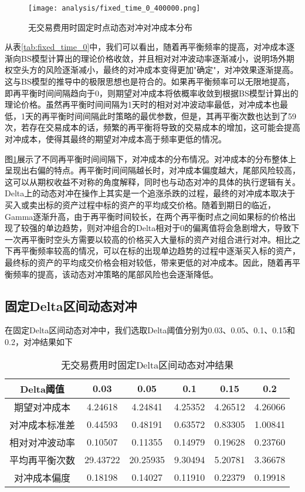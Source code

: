 \begin{figure}[htb]
  \centering
  \texttt{[image: analysis/fixed\_time\_0\_400000.png]}
  \caption[这里将出现在插图索引中]
    {无交易费用时固定时点动态对冲对冲成本分布}
  \label{fig:fixed_time_0}
\end{figure}

从表\ref{tab:fixed_time_0}中，我们可以看出，随着再平衡频率的提高，对冲成本逐渐向BS模型计算出的理论价格收敛，并且相对对冲波动率逐渐减小，说明场外期权空头方的风险逐渐减小，最终的对冲成本变得更加"确定"，对冲效果逐渐提高。这与BS模型的推导中的极限思想也是符合的。如果再平衡频率可以无限地提高，即再平衡时间间隔趋向于0，则期望对冲成本将依概率收敛到根据BS模型计算出的理论价格。虽然再平衡时间间隔为1天时的相对对冲波动率最低，对冲成本也最低，1天的再平衡时间间隔此时策略的最优参数，但是，其再平衡次数也达到了59次，若存在交易成本的话，频繁的再平衡将导致的交易成本的增加，这可能会提高对冲成本，使得其最终的期望对冲成本高于频率更低的情况。

图\ref{fig:fixed_time_0}展示了不同再平衡时间间隔下，对冲成本的分布情况。对冲成本的分布整体上呈现出右偏的特点。再平衡时间间隔越长时，对冲成本偏度越大，尾部风险较高，这可以从期权收益不对称的角度解释，同时也与动态对冲的具体的执行逻辑有关。Delta上的动态对冲在操作上其实是一个追涨杀跌的过程，最终的对冲成本取决于买入或卖出标的资产过程中标的资产的平均成交价格。随着到期日的临近，Gamma逐渐升高，由于再平衡时间较长，在两个再平衡时点之间如果标的价格出现了较强的单边趋势，则对冲组合的Delta相对于0的偏离值将会急剧增大，导致下一次再平衡时空头方需要以较高的价格买入大量标的资产对组合进行对冲。相比之下再平衡频率较高的情况，可以在标的出现单边趋势的过程中逐渐买入标的资产，最终标的资产的平均成交价格会相对较低，带来更低的对冲成本。因此，随着再平衡频率的提高，该动态对冲策略的尾部风险也会逐渐降低。

\subsection{固定Delta区间动态对冲}

在固定Delta区间动态对冲中，我们选取Delta阈值分别为0.03、0.05、0.1、0.15和0.2，对冲结果如下

\begin{table}[htbp]
  \centering
  \caption{无交易费用时固定Delta区间动态对冲结果}
  \label{tab:fixed_interval_0}
  \begin{tabular}{cccccc}
    \toprule
    Delta阈值 & 0.03 & 0.05 & 0.1 & 0.15 & 0.2 \\
    \midrule
    期望对冲成本 & 4.24618 & 4.24841 & 4.25352 & 4.26512 & 4.26066 \\
    对冲成本标准差 & 0.44593 & 0.48191 & 0.63572 & 0.83305 & 1.00841 \\
    相对对冲波动率 & 0.10507 & 0.11355 & 0.14979 & 0.19628 & 0.23760 \\
    平均再平衡次数 & 29.43722 & 20.25935 & 9.30494 & 5.20781 & 3.36678 \\
    对冲成本偏度 & 0.18198 & 0.14027 & 0.11910 & 0.22379 & 0.19918 \\
    \bottomrule
  \end{tabular}
\end{table}

